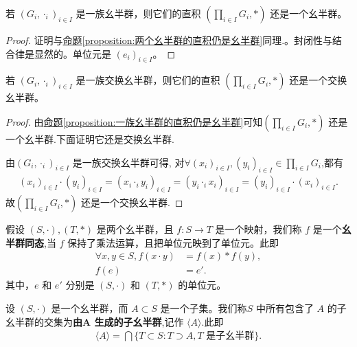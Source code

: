 \documentclass[../../main.tex]{subfiles}
\begin{document}
\begin{proposition}[一族幺半群的直积仍是幺半群]\label{proposition:一族幺半群的直积仍是幺半群}
若 $(G_i,\cdot_i)_{i\in I}$ 是一族幺半群，则它们的直积 $(\prod_{i\in I}G_i,*)$ 还是一个幺半群。  
\end{proposition}
\begin{proof}
证明与\hyperref[proposition:两个幺半群的直积仍是幺半群]{命题\ref{proposition:两个幺半群的直积仍是幺半群}}同理.。封闭性与结合律是显然的。单位元是 $(e_i)_{i\in I}$。 
\end{proof}

\begin{proposition}[一族交换幺半群的直积仍是交换幺半群]\label{proposition:一族交换幺半群的直积仍是交换幺半群}
若 $(G_i,\cdot_i)_{i\in I}$ 是一族交换幺半群，则它们的直积 $(\prod_{i\in I}G_i,*)$ 还是一个交换幺半群。  
\end{proposition}
\begin{proof}
由\hyperref[proposition:一族幺半群的直积仍是幺半群]{命题\ref{proposition:一族幺半群的直积仍是幺半群}}可知$(\prod_{i\in I}G_i,*)$ 还是一个幺半群.下面证明它还是交换幺半群.

由$(G_i,\cdot_i)_{i\in I}$ 是一族交换幺半群可得,
对$\forall (x_i)_{i\in I},(y_i)_{i\in I} \in \prod_{i\in I}G_i$,都有
\begin{align*}
\left( x_i \right) _{i\in I}\cdot \left( y_i \right) _{i\in I}=\left( x_i\cdot _iy_i \right) _{i\in I}=\left( y_i\cdot _ix_i \right) _{i\in I}=\left( y_i \right) _{i\in I}\cdot \left( x_i \right) _{i\in I}.
\end{align*}
故$(\prod_{i\in I}G_i,*)$ 还是一个交换幺半群.
\end{proof}

\begin{definition}[幺半群同态]
假设 $(S, \cdot), (T, *)$ 是两个幺半群，且 $f : S \to T$ 是一个映射，我们称 $f$ 是一个\textbf{幺半群同态},当 $f$ 保持了乘法运算，且把单位元映到了单位元。此即
\begin{align*}
\forall x, y \in S, f(x \cdot y) &= f(x) * f(y) ,\\
f(e) &= e'.
\end{align*}
其中，$e$ 和 $e'$ 分别是 $(S, \cdot)$ 和 $(T, *)$ 的单位元。 
\end{definition}

\begin{definition}[由子集生成的子幺半群]
设 $(S, \cdot)$ 是一个幺半群，而 $A \subset S$ 是一个子集。我们称$S$ 中所有包含了 $A$ 的子幺半群的交集为\textbf{由$\boldsymbol{A}$ 生成的子幺半群},记作 $\langle A \rangle$.此即
\begin{align*}
\langle A \rangle = \bigcap \{T \subset S : T \supset A, T \text{ 是子幺半群}\}.
\end{align*} 
\end{definition}
\end{document}
